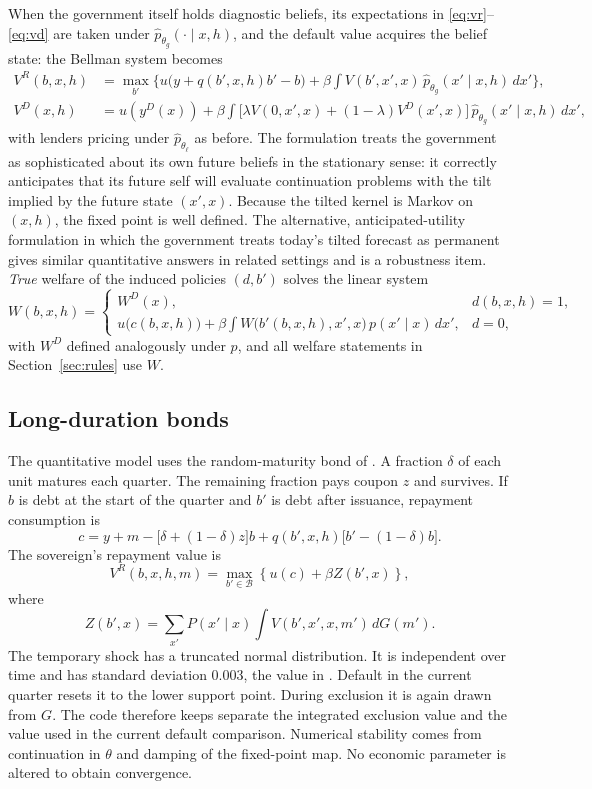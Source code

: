\documentclass[11pt]{article}
\theoremstyle{definition}
\begin{document}
When the government itself holds diagnostic beliefs, its expectations in \eqref{eq:vr}--\eqref{eq:vd} are taken under $\hat p_{\theta_g}(\cdot \mid x, h)$, and the default value acquires the belief state: the Bellman system becomes
\begin{align}
V^R(b, x, h) &= \max_{b'} \Big\{ u\big(y + q(b',x,h)b' - b\big) + \beta \int V(b', x', x)\, \hat p_{\theta_g}(x' \mid x, h)\, dx' \Big\}, \\
V^D(x, h) &= u(y^D(x)) + \beta \int \big[ \lambda V(0, x', x) + (1-\lambda) V^D(x', x) \big]\, \hat p_{\theta_g}(x' \mid x, h)\, dx',
\end{align}
with lenders pricing under $\hat p_{\theta_\ell}$ as before. The formulation treats the government as sophisticated about its own future beliefs in the stationary sense: it correctly anticipates that its future self will evaluate continuation problems with the tilt implied by the future state $(x', x)$. Because the tilted kernel is Markov on $(x, h)$, the fixed point is well defined. The alternative, anticipated-utility formulation in which the government treats today's tilted forecast as permanent gives similar quantitative answers in related settings and is a robustness item. \emph{True} welfare of the induced policies $(d, b')$ solves the linear system
\[
W(b, x, h) = \begin{cases} W^D(x), & d(b,x,h) = 1,\\[2pt]
u\big(c(b,x,h)\big) + \beta \int W\big(b'(b,x,h), x', x\big)\, p(x' \mid x)\, dx', & d = 0,\end{cases}
\]
with $W^D$ defined analogously under $p$, and all welfare statements in Section~\ref{sec:rules} use $W$.

\subsection{Long-duration bonds}\label{app:longbonds}

The quantitative model uses the random-maturity bond of \citet{ChatterjeeEyigungor2012}. A fraction $\delta$ of each unit matures each quarter. The remaining fraction pays coupon $z$ and survives. If $b$ is debt at the start of the quarter and $b'$ is debt after issuance, repayment consumption is
\begin{equation}
c=y+m-\bigl[\delta+(1-\delta)z\bigr]b
+q(b',x,h)\bigl[b'-(1-\delta)b\bigr].
\label{eq:longbudget}
\end{equation}
The sovereign's repayment value is
\[
V^R(b,x,h,m)=\max_{b'\in\mathcal B}
\left\{u(c)+\beta Z(b',x)\right\},
\]
where
\[
Z(b',x)=\sum_{x'}P(x'\mid x)
\int V(b',x',x,m')\,dG(m').
\]
The temporary shock has a truncated normal distribution. It is independent over time and has standard deviation $0.003$, the value in \citet{ChatterjeeEyigungor2012}. Default in the current quarter resets it to the lower support point. During exclusion it is again drawn from $G$. The code therefore keeps separate the integrated exclusion value and the value used in the current default comparison. Numerical stability comes from continuation in $\theta$ and damping of the fixed-point map. No economic parameter is altered to obtain convergence.
\end{document}
